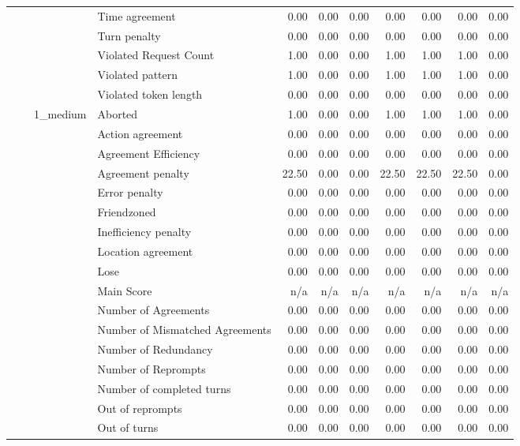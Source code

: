 \begin{tabular}{llllrrrrrrr}
 &  &  & Time agreement & 0.00 & 0.00 & 0.00 & 0.00 & 0.00 & 0.00 & 0.00 \\
 &  &  & Turn penalty & 0.00 & 0.00 & 0.00 & 0.00 & 0.00 & 0.00 & 0.00 \\
 &  &  & Violated Request Count & 1.00 & 0.00 & 0.00 & 1.00 & 1.00 & 1.00 & 0.00 \\
 &  &  & Violated pattern & 1.00 & 0.00 & 0.00 & 1.00 & 1.00 & 1.00 & 0.00 \\
 &  &  & Violated token length & 0.00 & 0.00 & 0.00 & 0.00 & 0.00 & 0.00 & 0.00 \\
\cline{3-11}
 &  & \multirow[t]{27}{*}{1_medium} & Aborted & 1.00 & 0.00 & 0.00 & 1.00 & 1.00 & 1.00 & 0.00 \\
 &  &  & Action agreement & 0.00 & 0.00 & 0.00 & 0.00 & 0.00 & 0.00 & 0.00 \\
 &  &  & Agreement Efficiency & 0.00 & 0.00 & 0.00 & 0.00 & 0.00 & 0.00 & 0.00 \\
 &  &  & Agreement penalty & 22.50 & 0.00 & 0.00 & 22.50 & 22.50 & 22.50 & 0.00 \\
 &  &  & Error penalty & 0.00 & 0.00 & 0.00 & 0.00 & 0.00 & 0.00 & 0.00 \\
 &  &  & Friendzoned & 0.00 & 0.00 & 0.00 & 0.00 & 0.00 & 0.00 & 0.00 \\
 &  &  & Inefficiency penalty & 0.00 & 0.00 & 0.00 & 0.00 & 0.00 & 0.00 & 0.00 \\
 &  &  & Location agreement & 0.00 & 0.00 & 0.00 & 0.00 & 0.00 & 0.00 & 0.00 \\
 &  &  & Lose & 0.00 & 0.00 & 0.00 & 0.00 & 0.00 & 0.00 & 0.00 \\
 &  &  & Main Score & n/a & n/a & n/a & n/a & n/a & n/a & n/a \\
 &  &  & Number of Agreements & 0.00 & 0.00 & 0.00 & 0.00 & 0.00 & 0.00 & 0.00 \\
 &  &  & Number of Mismatched Agreements & 0.00 & 0.00 & 0.00 & 0.00 & 0.00 & 0.00 & 0.00 \\
 &  &  & Number of Redundancy & 0.00 & 0.00 & 0.00 & 0.00 & 0.00 & 0.00 & 0.00 \\
 &  &  & Number of Reprompts & 0.00 & 0.00 & 0.00 & 0.00 & 0.00 & 0.00 & 0.00 \\
 &  &  & Number of completed turns & 0.00 & 0.00 & 0.00 & 0.00 & 0.00 & 0.00 & 0.00 \\
 &  &  & Out of reprompts & 0.00 & 0.00 & 0.00 & 0.00 & 0.00 & 0.00 & 0.00 \\
 &  &  & Out of turns & 0.00 & 0.00 & 0.00 & 0.00 & 0.00 & 0.00 & 0.00 \\

\end{tabular}
